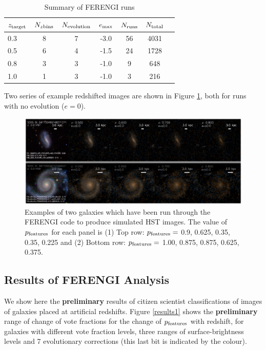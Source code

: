 \documentclass[usenatbib]{mn2e}
\begin{document}
\begin{table}
\caption{Summary of FERENGI runs \label{ferengivalues}}
\begin{tabular}{lcccccc}
\hline\hline
$z_{\rm target}$ &  $N_{z {\rm bins}}$ & $N_{\rm evolution}$ & $e_{\rm max}$ & $N_{\rm runs}$ & $N_{\rm total}$\\
\hline
0.3 & 8 & 7 & -3.0 & 56 & 4031 \\
0.5 & 6 & 4 & -1.5 & 24 & 1728 \\
0.8 & 3 & 3 & -1.0 & 9 & 648 \\
1.0 & 1 & 3 & -1.0 & 3 & 216 \\
\hline\hline
\end{tabular}
\end{table}

Two series of example redshifted images are shown in Figure \ref{exampleFERENGI}, both for runs with no evolution ($e=0$). 

\begin{figure}
\includegraphics[width=160mm]{example_ferengi.ps}
\caption{Examples of two galaxies which have been run through the FERENGI code to produce simulated HST images. The value of $p_{\rm features}$ for each panel is (1) Top row: $p_{\rm features}=$ 0.9, 0.625, 0.35, 0.35, 0.225 and (2) Bottom row: $p_{\rm features}=$ 1.00, 0.875, 0.875, 0.625, 0.375. \label{exampleFERENGI}}
\end{figure}

 

\subsection{Results of FERENGI Analysis}

We show here the {\bf preliminary} results of citizen scientist classifications of images of galaxies placed at artificial redshifts. Figure \ref{results1} shows the {\bf preliminary} range of change of vote fractions for the change of $p_{\rm features}$ with redshift, for galaxies with different vote fraction levels, three ranges of surface-brightness levels and 7 evolutionary corrections (this last bit is indicated by the colour). 
\end{document}

